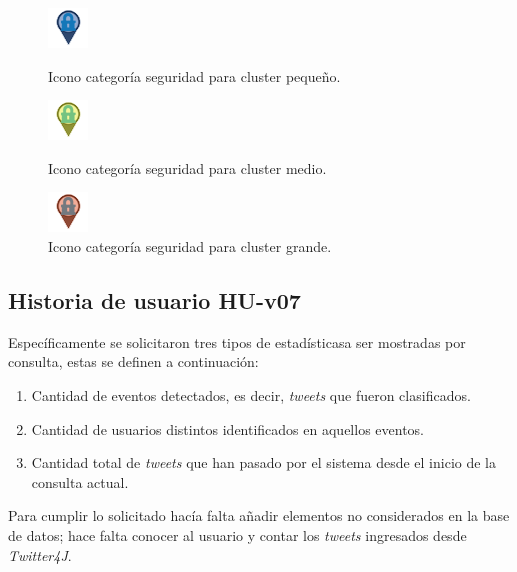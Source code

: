 \begin{figure}[H]
	\centering
	\captionsetup{justification=centering}
	\includegraphics[scale=1]{images/categorias/seguridadS.png}
	\caption[Icono categoría seguridad para cluster pequeño.]{Icono categoría seguridad para cluster pequeño.}
	\label{fig:seguridadS}
	\endminipage\hfill
	\centering
	\captionsetup{justification=centering}
	\includegraphics[scale=1]{images/categorias/seguridadM.png}
	\caption[Icono categoría seguridad para cluster medio.]{Icono categoría seguridad para cluster medio.}
	\label{fig:seguridadM}
	\endminipage\hfill
	\centering
	\captionsetup{justification=centering}
	\includegraphics[scale=1]{images/categorias/seguridadL.png}
	\caption[Icono categoría seguridad para cluster grande.]{Icono categoría seguridad para cluster grande.}
	\label{fig:seguridadL}
	\endminipage\hfill
\end{figure}

\subsection{Historia de usuario HU-v07}
\label{subsec:HU-v07}

Específicamente se solicitaron tres tipos de estadísticasa ser mostradas por consulta, estas se definen a continuación:

\begin{enumerate}
\item Cantidad de eventos detectados, es decir, \textit{tweets} que fueron clasificados.
\item Cantidad de usuarios distintos identificados en aquellos eventos.
\item Cantidad total de \textit{tweets} que han pasado por el sistema desde el inicio de la consulta actual.
\end{enumerate}

Para cumplir lo solicitado hacía falta añadir elementos no considerados en la base de datos; hace falta conocer al usuario y contar los \textit{tweets} ingresados desde \textit{Twitter4J}.\\

